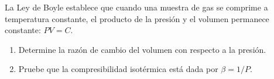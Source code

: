 \item La Ley de Boyle establece que cuando una muestra de gas se comprime a temperatura constante, el producto de la presión y el volumen permanece constante: $PV = C$.
\begin{enumerate}
    \item[(a)] Determine la razón de cambio del volumen con respecto a la presión.
    \item[(b)] Pruebe que la compresibilidad isotérmica está dada por $\beta = 1/P$.
\end{enumerate}
